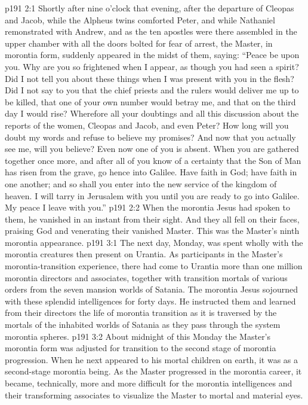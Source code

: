 \vs p191 2:1 Shortly after nine o’clock that evening, after the departure of Cleopas and Jacob, while the Alpheus twins comforted Peter, and while Nathaniel remonstrated with Andrew, and as the ten apostles were there assembled in the upper chamber with all the doors bolted for fear of arrest, the Master, in morontia form, suddenly appeared in the midst of them, saying: \textcolor{ubdarkred}{“Peace be upon you. Why are you so frightened when I appear, as though you had seen a spirit? Did I not tell you about these things when I was present with you in the flesh? Did I not say to you that the chief priests and the rulers would deliver me up to be killed, that one of your own number would betray me, and that on the third day I would rise? Wherefore all your doubtings and all this discussion about the reports of the women, Cleopas and Jacob, and even Peter? How long will you doubt my words and refuse to believe my promises? And now that you actually see me, will you believe? Even now one of you is absent. When you are gathered together once more, and after all of you know of a certainty that the Son of Man has risen from the grave, go hence into Galilee. Have faith in God; have faith in one another; and so shall you enter into the new service of the kingdom of heaven. I will tarry in Jerusalem with you until you are ready to go into Galilee. My peace I leave with you.”}\plusone
\vs p191 2:2 When the morontia Jesus had spoken to them, he vanished in an instant from their sight. And they all fell on their faces, praising God and venerating their vanished Master. This was the Master’s ninth morontia appearance.
\vs p191 3:1 The next day, Monday, was spent wholly with the morontia creatures then present on Urantia. As participants in the Master’s morontia\hyp{}transition experience, there had come to Urantia more than one million morontia directors and associates, together with transition mortals of various orders from the seven mansion worlds of Satania. The morontia Jesus sojourned with these splendid intelligences for forty days. He instructed them and learned from their directors the life of morontia transition as it is traversed by the mortals of the inhabited worlds of Satania as they pass through the system morontia spheres.
\vs p191 3:2 About midnight of this Monday the Master’s morontia form was adjusted for transition to the second stage of morontia progression. When he next appeared to his mortal children on earth, it was as a second\hyp{}stage morontia being. As the Master progressed in the morontia career, it became, technically, more and more difficult for the morontia intelligences and their transforming associates to visualize the Master to mortal and material eyes.
